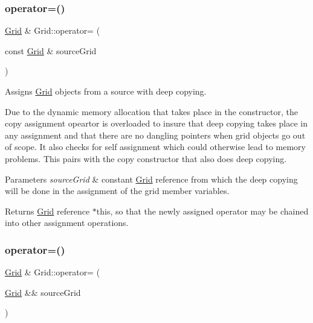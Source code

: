 \subsubsection{\texorpdfstring{operator=()}{operator=()}\hspace{0.1cm}{\footnotesize\ttfamily [1/2]}}
{\footnotesize\ttfamily \hyperlink{class_grid}{Grid} \& Grid\+::operator= (\begin{DoxyParamCaption}\item[{const \hyperlink{class_grid}{Grid} \&}]{source\+Grid }\end{DoxyParamCaption})}



Assigns \hyperlink{class_grid}{Grid} objects from a source with deep copying. 

Due to the dynamic memory allocation that takes place in the constructor, the copy assignment opeartor is overloaded to insure that deep copying takes place in any assignment and that there are no dangling pointers when grid objects go out of scope. It also checks for self assignment which could otherwise lead to memory problems. This pairs with the copy constructor that also does deep copying.


\begin{DoxyParams}{Parameters}
{\em source\+Grid} & constant \hyperlink{class_grid}{Grid} reference from which the deep copying will be done in the assignment of the grid member variables.\\
\hline
\end{DoxyParams}
\begin{DoxyReturn}{Returns}
\hyperlink{class_grid}{Grid} reference $\ast$this, so that the newly assigned operator may be chained into other assignment operations. 
\end{DoxyReturn}
\mbox{\label{class_grid_a9f84434eb37abc5cd0979cd609b2a2d8}} 
\subsubsection{\texorpdfstring{operator=()}{operator=()}\hspace{0.1cm}{\footnotesize\ttfamily [2/2]}}
{\footnotesize\ttfamily \hyperlink{class_grid}{Grid} \& Grid\+::operator= (\begin{DoxyParamCaption}\item[{\hyperlink{class_grid}{Grid} \&\&}]{source\+Grid }\end{DoxyParamCaption})}



